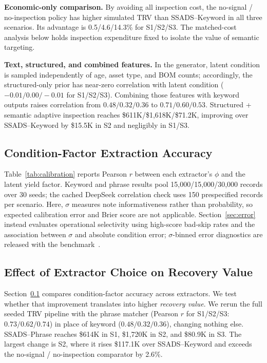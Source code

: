 \documentclass[a4paper,conference]{IEEEtran}
\begin{document}
\smallskip\noindent\textbf{Economic-only comparison.}
By avoiding all inspection cost, the no-signal / no-inspection policy has higher
simulated TRV than SSADS--Keyword in all three scenarios. Its advantage is
0.5/4.6/14.3\% for S1/S2/S3. The matched-cost analysis below holds inspection
expenditure fixed to isolate the value of semantic targeting.

\smallskip\noindent\textbf{Text, structured, and combined features.}
In the generator, latent condition is sampled independently of age, asset type,
and BOM counts; accordingly, the structured-only prior has near-zero correlation
with latent condition ($-0.01/0.00/-0.01$ for S1/S2/S3). Combining those features
with keyword outputs raises correlation from $0.48/0.32/0.36$ to
$0.71/0.60/0.53$. Structured + semantic adaptive inspection reaches
\$611K/\$1,618K/\$71.2K, improving over SSADS--Keyword by \$15.5K in S2 and
negligibly in S1/S3.

\subsection{Condition-Factor Extraction Accuracy}\label{sec:calibration}

Table~\ref{tab:calibration} reports Pearson $r$ between each extractor's $\phi$ and
the latent yield factor. Keyword and phrase results pool 15,000/15,000/30,000
records over 30
seeds; the cached DeepSeek correlation check uses 150 prespecified records per scenario.
Here, $\sigma$ measures note informativeness rather than probability, so expected
calibration error and Brier score are not applicable. Section~\ref{sec:error}
instead evaluates operational selectivity using high-score bad-skip rates and the
association between $\sigma$ and absolute condition error; $\sigma$-binned error
diagnostics are released with the benchmark~\cite{RLDBRepo}.

\subsection{Effect of Extractor Choice on Recovery Value}\label{sec:cal2val}
Section~\ref{sec:calibration} compares condition-factor accuracy across extractors. We
test whether that improvement translates into higher \emph{recovery value}. We rerun the full
seeded TRV pipeline with the phrase matcher (Pearson $r$ for S1/S2/S3:
$0.73/0.62/0.74$) in place of keyword ($0.48/0.32/0.36$), changing nothing
else. SSADS--Phrase reaches \$614K in S1, \$1,720K in S2, and \$80.9K in S3. The largest
change is S2, where it rises \$117.1K over SSADS--Keyword and exceeds the no-signal /
no-inspection comparator by 2.6\%.
\end{document}
